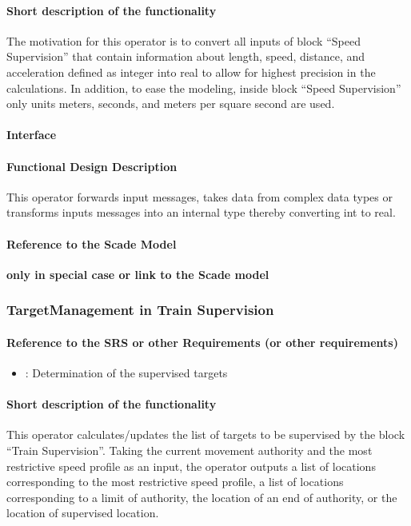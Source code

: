 \paragraph{Short description of the functionality}
The motivation for this operator is to convert all inputs of block ``Speed Supervision'' that contain information about length, speed, distance, and acceleration defined as integer into real to allow for highest precision in the calculations. In addition, to ease the modeling, inside block ``Speed Supervision'' only units meters, seconds, and meters per square second are used.

\paragraph{Interface}

\paragraph{Functional Design Description}
This operator forwards input messages, takes data from complex data types or transforms inputs messages into an internal type thereby converting int to real.
  
\paragraph{Reference to the Scade Model}
\textbf{only in special case or link to the Scade model}

\subsubsection{TargetManagement in Train Supervision} 
\paragraph{Reference to the SRS or other Requirements (or other requirements)}
\begin{itemize}
	\item \cite[Chapt.~3.13.8.2]{subset-026}: Determination of the supervised targets 
\end{itemize}

\paragraph{Short description of the functionality}
This operator calculates/updates the list of targets to be supervised by the block ``Train Supervision''. Taking the current movement authority and the most restrictive speed profile as an input, the operator outputs a list of locations corresponding to the most restrictive speed profile, a list of locations corresponding to a limit of authority, the location of an end of authority, or the location of supervised location.
  
